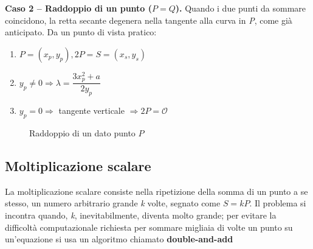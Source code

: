\documentclass[12pt, a4paper]{report}
\begin{document}
\textbf{Caso 2 -- Raddoppio di un punto ($P = Q$).} Quando i due punti da sommare coincidono, 
la retta secante degenera nella tangente alla curva in \textit{P}, come già anticipato. Da un 
punto di vista pratico:
\begin{enumerate}
    \item $P = (x_p, y_p), 2P = S = (x_s, y_s)$
    \item $y_p \neq 0 \Rightarrow \lambda = \dfrac{3x_p^2 + a}{2y_p}$ 
    \item $y_p = 0 \Rightarrow$ tangente verticale $\Rightarrow 2P = \mathcal{O}$
\end{enumerate}

\begin{figure} [H]
    \centering
    \caption{Raddoppio di un dato punto $P$}
\end{figure}

\subsection{Moltiplicazione scalare}
La moltiplicazione scalare consiste nella ripetizione della somma di un punto a se stesso, un numero arbitrario grande \textit{k} volte, segnato come $S = kP$.
Il problema si incontra quando, \textit{k}, inevitabilmente, diventa molto grande; per evitare la difficoltà computazionale richiesta per sommare migliaia di volte un punto su un'equazione si usa un algoritmo chiamato \textbf{double-and-add}
\end{document}
